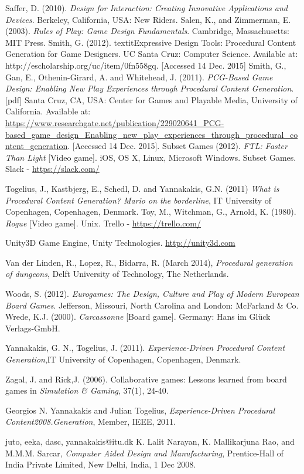 \documentclass[a4paper,11pt]{report}
\begin{document}
\begin{thebibliography}{1}
Saffer, D. (2010). \textit{Design for Interaction: Creating Innovative Applications and Devices}. Berkeley, California, USA: New Riders.
Salen, K., and Zimmerman, E. (2003). \textit{Rules of Play: Game Design Fundamentals}. Cambridge, Massachusetts: MIT Press.
Smith, G. (2012). textit{Expressive Design Tools: Procedural Content Generation for Game Designers}. UC Santa Cruz: Computer Science. Available at: http://escholarship.org/uc/item/0fn558gq. [Accessed 14 Dec. 2015]
Smith, G., Gan, E., Othenin-Girard, A. and Whitehead, J. (2011). \textit{PCG-Based Game Design: Enabling New Play Experiences through Procedural Content Generation}. [pdf] Santa Cruz, CA, USA: Center for Games and Playable Media, University of California. Available at: \url{https://www.researchgate.net/publication/229020641_PCG-based_game_design_Enabling_new_play_experiences_through_procedural_content_generation}. [Accessed 14 Dec. 2015].
Subset Games (2012). \textit{FTL: Faster Than Light} [Video game]. iOS, OS X, Linux, Microsoft Windows. Subset Games.
Slack - \url{https://slack.com/}

Togelius, J., Kastbjerg, E., Schedl, D. and Yannakakis, G.N. (2011) \emph{What is Procedural Content Generation? Mario on the borderline}, IT University of Copenhagen, Copenhagen, Denmark.
Toy, M., Witchman, G., Arnold, K. (1980). \textit{Rogue} [Video game]. Unix.
Trello - \url{https://trello.com/}


Unity3D Game Engine, Unity Technologies.
\url{http://unity3d.com}

Van der Linden, R., Lopez, R., Bidarra, R. (March 2014), \textit{Procedural generation of dungeons}, Delft University of Technology, The Netherlands.

Woods, S. (2012). \textit{Eurogames: The Design, Culture and Play of Modern European Board Games}. Jefferson, Missouri, North Carolina and London: McFarland \& Co.
Wrede, K.J. (2000). \textit{Carcassonne} [Board game]. Germany: Hans im Glück Verlags-GmbH.

Yannakakis, G. N., Togelius, J. (2011). \textit{Experience-Driven Procedural Content Generation},IT University of Copenhagen, Copenhagen, Denmark.

Zagal, J. and Rick,J. (2006). Collaborative games: Lessons learned from board games in \textit{Simulation \& Gaming}, 37(1), 24-40.

Georgios N. Yannakakis and Julian Togelius, \emph{Experience-Driven Procedural Content2008.Generation}, Member, IEEE, 2011.

{juto, eeka, dasc, yannakakis}@itu.dk
K. Lalit Narayan, K. Mallikarjuna Rao, and M.M.M. Sarcar, \emph{Computer Aided Design and Manufacturing}, Prentice-Hall of India Private Limited, New Delhi, India, 1 Dec 2008.

\end{thebibliography}
\pagebreak
\appendix
\end{document}
